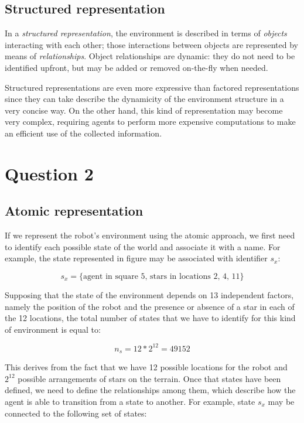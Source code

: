 \documentclass[letterpaper,headings=standardclasses]{scrartcl}
\begin{document}
\subsection{Structured representation}

In a \emph{structured representation}, the environment is described in terms of \emph{objects} interacting with each other; those interactions between objects are represented by means of \emph{relationships}. Object relationships are dynamic: they do not need to be identified upfront, but may be added or removed on-the-fly when needed.

Structured representations are even more expressive than factored representations since they can take describe the dynamicity of the environment structure in a very concise way. On the other hand, this kind of representation may become very complex, requiring agents to perform more expensive computations to make an efficient use of the collected information.

\section{Question 2}

\subsection{Atomic representation}

If we represent the robot’s environment using the atomic approach, we first need to identify each possible state of the world and associate it with a name. For example, the state represented in figure may be associated with identifier $s_x$:

$$ s_x = \{ \text{agent in square 5, stars in locations 2, 4, 11} \} $$

Supposing that the state of the environment depends on 13 independent factors, namely the position of the robot and the presence or absence of a star in each of the 12 locations, the total number of states that we have to identify for this kind of environment is equal to:

$$ n_s = 12 * 2^{12} = 49152 $$

This derives from the fact that we have 12 possible locations for the robot and $2^{12}$ possible arrangements of stars on the terrain. Once that states have been defined, we need to define the relationships among them, which describe how the agent is able to transition from a state to another. For example, state $s_x$ may be connected to the following set of states:
\end{document}

